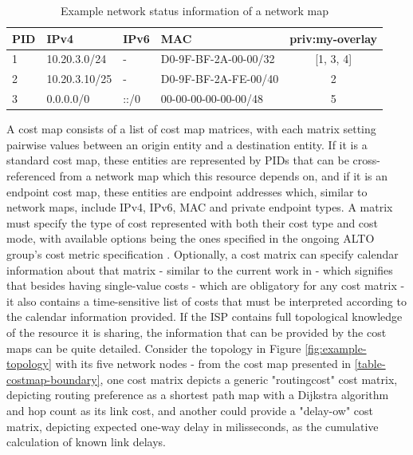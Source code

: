 \begin{table}[]
\caption{Example network status information of a network map}
\begin{tabular}{|l|l|l|l|c|}
    \hline
PID  & IPv4          & IPv6                  & MAC                  & priv:my-overlay                     \\ \hline
1    & 10.20.3.0/24  & -                     & D0-9F-BF-2A-00-00/32 & [1, 3, 4]                           \\ \hline
2    & 10.20.3.10/25 & -                     & D0-9F-BF-2A-FE-00/40 & 2                                   \\ \hline
3    & 0.0.0.0/0     & ::/0                  & 00-00-00-00-00-00/48 & 5                                   \\ \hline
\end{tabular}
\label{table:networkmap-example}
\end{table}

    A cost map consists of a list of cost map matrices, with each matrix setting pairwise values between an origin entity and a destination entity.
    If it is a standard cost map, these entities are represented by PIDs that can be cross-referenced from a network map which this resource depends on, and if it is an endpoint cost map, these entities are endpoint addresses which, similar to network maps, include IPv4, IPv6, MAC and private endpoint types.
    A matrix must specify the type of cost represented with both their cost type and cost mode, with available options being the ones specified in the ongoing ALTO group's cost metric specification \cite{alto-cost-metrics(draft)}.
    Optionally, a cost matrix can specify calendar information about that matrix - similar to the current work in \cite{alto-calendar-cost-map(draft)} -  which signifies that besides having single-value costs - which are obligatory for any cost matrix - it also contains a time-sensitive list of costs that must be interpreted according to the calendar information provided.
    If the ISP contains full topological knowledge of the resource it is sharing, the information that can be provided by the cost maps can be quite detailed.
    Consider the topology in Figure \ref{fig:example-topology} with its five network nodes - from the cost map presented in \ref{table-costmap-boundary}, one cost matrix depicts a generic "routingcost" cost matrix, depicting routing preference as a shortest path map with a Dijkstra algorithm and hop count as its link cost, and another could provide a "delay-ow" cost matrix, depicting expected one-way delay in milisseconds, as the cumulative calculation of known link delays.

